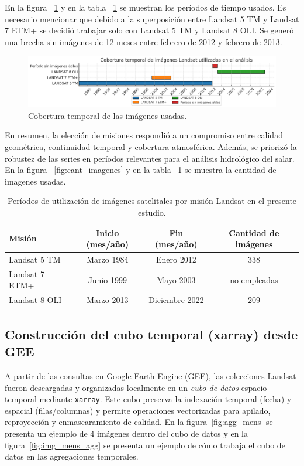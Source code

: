 En la figura ~\ref{fig:cob_temporal} y en la tabla ~\ref{tab:periodos_landsat} se muestran los períodos de tiempo usados. Es necesario mencionar que debido a la superposición entre Landsat 5 TM y Landsat 7 ETM+ se decidió trabajar solo con Landsat 5 TM y Landsat 8 OLI. Se generó una brecha sin imágenes de 12 meses entre febrero de 2012 y febrero de 2013.

\begin{figure}[ht]
        \centering
        \includegraphics[scale=.4]
        {Figures/fig11.png}
        \caption{Cobertura temporal de las imágenes usadas.}
        \label{fig:cob_temporal}
\end{figure}

En resumen, la elección de misiones respondió a un compromiso entre calidad geométrica, continuidad temporal y cobertura atmosférica. Además,  se priorizó la robustez de las series en períodos relevantes para el análisis hidrológico del salar. En la figura ~\ref{fig:cant_imagenes} y en la tabla ~\ref{tab:periodos_landsat} se muestra la cantidad de imagenes usadas. 


\begin{table}[h]
	\centering
	\caption[Períodos Landsat]{Períodos de utilización de imágenes satelitales por misión Landsat en el presente estudio.}
	\begin{tabular}{l c c c}    
		\toprule
		\textbf{Misión}     & \textbf{Inicio (mes/año)} & \textbf{Fin (mes/año)} & \textbf{Cantidad de imágenes} \\
		\midrule
		Landsat 5 TM        & Marzo 1984   & Enero 2012        & 338 \\		
		Landsat 7 ETM+      & Junio 1999   & Mayo 2003         & no empleadas \\
		Landsat 8 OLI       & Marzo 2013   & Diciembre 2022    & 209 \\
		\bottomrule
	\end{tabular}
        \hline
	\label{tab:periodos_landsat}
\end{table}

\subsection{Construcción del cubo temporal (xarray) desde GEE}
A partir de las consultas en Google Earth Engine (GEE), las colecciones Landsat fueron descargadas y organizadas localmente en un \emph{cubo de datos} espacio–temporal mediante \texttt{xarray}. Este cubo preserva la indexación temporal (fecha) y espacial (filas/columnas) y permite operaciones vectorizadas para apilado, reproyección y enmascaramiento de calidad. En la figura~\ref{fig:agg_mens} se presenta un ejemplo de 4 imágenes dentro del cubo de datos y en la figura~\ref{fig:img_mens_agg} se presenta un ejemplo de cómo trabaja el cubo de datos en las agregaciones temporales.


